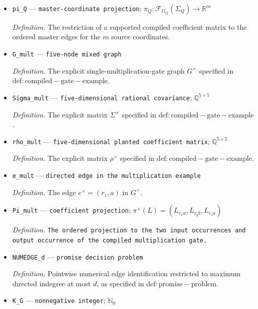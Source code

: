 \documentclass{article}
\begin{document}
\begin{itemize}
  \par\smallskip\noindent\emph{Definition.} The rational feasible witness returned by \(\mathsf C(Q)\).
  \item \texttt{pi\_\allowbreak{}Q} --- \texttt{master-\allowbreak{}coordinate projection}; \(\pi_Q:\mathcal F_{G_Q}(\Sigma_Q)\to\mathbb R^m\)
  \par\smallskip\noindent\emph{Definition.} The restriction of a supported compiled coefficient matrix to the ordered master edges for the \(m\) source coordinates.
  \item \texttt{G\_\allowbreak{}mult} --- \texttt{five-\allowbreak{}node mixed graph}
  \par\smallskip\noindent\emph{Definition.} The explicit single-multiplication-gate graph \(G^{\times}\) specified in \(\mathrm{def:compiled-gate-example}\).
  \item \texttt{Sigma\_\allowbreak{}mult} --- \texttt{five-\allowbreak{}dimensional rational covariance}; \(\mathbb Q^{5\times5}\)
  \par\smallskip\noindent\emph{Definition.} The explicit matrix \(\Sigma^{\times}\) specified in \(\mathrm{def:compiled-gate-example}\).
  \item \texttt{rho\_\allowbreak{}mult} --- \texttt{five-\allowbreak{}dimensional planted coefficient matrix}; \(\mathbb Q^{5\times5}\)
  \par\smallskip\noindent\emph{Definition.} The explicit matrix \(\rho^{\times}\) specified in \(\mathrm{def:compiled-gate-example}\).
  \item \texttt{e\_\allowbreak{}mult} --- \texttt{directed edge in the multiplication example}
  \par\smallskip\noindent\emph{Definition.} The edge \(e^{\times}=(r_z,a)\) in \(G^{\times}\).
  \item \texttt{Pi\_\allowbreak{}mult} --- \texttt{coefficient projection}; \(\pi^{\times}(L)=(L_{r_xa},L_{r_yb},L_{r_za})\)
  \par\smallskip\noindent\emph{Definition.} \texttt{The ordered projection to the two input occurrences and output occurrence of the compiled multiplication gate.}
  \item \texttt{NUMEDGE\_\allowbreak{}d} --- \texttt{promise decision problem}
  \par\smallskip\noindent\emph{Definition.} Pointwise numerical edge identification restricted to maximum directed indegree at most \(d\), as specified in \(\mathrm{def:promise-problem}\).
  \item \texttt{K\_\allowbreak{}G} --- \texttt{nonnegative integer}; \(\mathbb N_0\)

\end{itemize}
\end{document}
